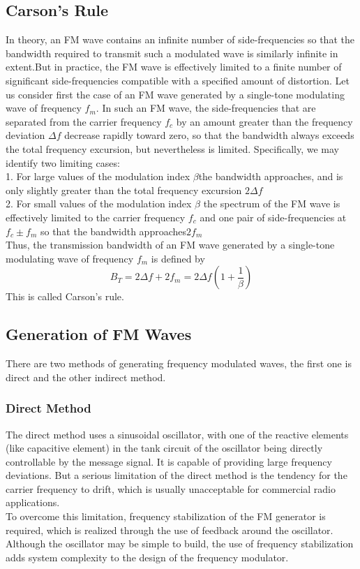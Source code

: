 \documentclass[12pt,a4paper]{article}%
\begin{document}
\begin{flushleft}
	\subsection{Carson's Rule}
	In theory, an FM wave contains an infinite number of side-frequencies so that the bandwidth required to transmit such a modulated wave is similarly infinite in extent.But in practice, the FM wave is effectively limited to a finite number of significant side-frequencies compatible with a specified amount of distortion.
	Let us consider first the case of an FM wave generated by a single-tone modulating wave of frequency $f_m$. In such an FM wave, the side-frequencies that are separated from the carrier frequency $f_c$ by an amount greater than the frequency deviation $\Delta f$ decrease rapidly toward zero, so that the bandwidth always exceeds the total frequency excursion, but nevertheless is limited. Specifically, we may identify two limiting cases: \\
	1. For large values of the modulation index $\beta$the bandwidth approaches, and is only slightly greater than the total frequency excursion $2\Delta f$\\
	2. For small values of the modulation index $\beta$ the spectrum of the FM wave is effectively limited to the carrier frequency $f_c$ and one pair of side-frequencies at$f_c\pm f_m$ so that the bandwidth approaches$2f_m$\\
	Thus, the transmission bandwidth of an FM wave generated by a single-tone modulating wave of frequency $f_m$ is defined by
	$$B_T=2\Delta f +2f_m=2\Delta f(1+\frac{1}{\beta}) $$
	This is called Carson's rule.
	
	
	\subsection{Generation of FM Waves}
	There are two methods of generating frequency modulated waves, the first one is direct and the other indirect method.
	\subsubsection{Direct Method}
	The direct method uses a sinusoidal oscillator, with one of the reactive elements (like capacitive element) in the tank circuit of the oscillator being directly controllable by the message signal. It is capable of providing large frequency deviations. But a serious limitation of the direct method is the tendency for the carrier frequency to drift, which is usually unacceptable for commercial radio applications.\\
	To overcome this limitation, frequency
	stabilization of the FM generator is required, which is realized through the use of feedback around the oscillator.
	Although the oscillator may be simple to build, the use of frequency stabilization adds system complexity to the design of the frequency modulator.
	

\end{flushleft}
\end{document}

